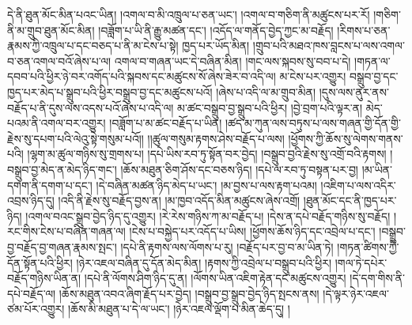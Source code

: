 དེ་ནི་ཐུན་མོང་མིན་པའང་ཡིན། །འགལ་བ་མི་འཁྲུལ་པ་ཅན་ཡང་། །འགལ་བ་གཅིག་ནི་མཚུངས་པར་རོ། །གཅིག་ནི་མ་གྲུབ་ཐུན་མོང་མིན། །བཟློག་པ་ཡི་ནི་རྒྱུ་མཚན་དང་། །འདོད་ལ་གནོད་བྱེད་ཀྱང་མ་བརྗོད། །རིགས་པ་ཅན་རྣམས་ཀྱི་འཁྲུལ་པ་དང་བཅད་པ་ནི་མ་ངེས་པ་སྟེ། ཁྱད་པར་ཡོད་མིན། །གྲུབ་པའི་མཐའ་ཁས་བླངས་པ་ལས་འགལ་བ་ཅན་འགལ་བའོ་ཞེས་པ་ལ། འགལ་བ་གཞན་ཡང་དེ་བཞིན་མིན། །གང་ལས་སྐབས་སུ་བབ་པ་དེ། །གཏན་ལ་དབབ་པའི་ཕྱིར་ཉེ་བར་འགོད་པའི་སྐབས་དང་མཚུངས་སོ་ཞེས་ཟེར་བ་འདི་ལ། མ་ངེས་པར་འགྱུར། བསྒྲུབ་བྱ་དང་ཁྱད་པར་མེད་པ་སྒྲུབ་པའི་ཕྱིར་བསྒྲུབ་བྱ་དང་མཚུངས་པའོ། །ཞེས་པ་འདི་ལ་མ་གྲུབ་མིན། །དུས་ལས་ནུར་ནས་བརྗོད་པ་ནི་དུས་ལས་འདས་པའོ་ཞེས་པ་འདི་ལ། མ་ཚང་བསྒྲུབ་བྱ་སྒྲུབ་པའི་ཕྱིར། །བྱེ་བྲག་པའི་ལྟར་ན། མེད་པའམ་ནི་འགལ་བར་འགྱུར། །བཟློག་པ་མ་ཚང་བརྗོད་པ་ཡིན། །ཚད་མ་ཀུན་ལས་བཏུས་པ་ལས་གཞན་གྱི་དོན་གྱི་རྗེས་སུ་དཔག་པའི་ལེའུ་སྟེ་གསུམ་པའོ།། །།ཚུལ་གསུམ་རྟགས་ཤེས་བརྗོད་པ་ལས། །ཕྱོགས་ཀྱི་ཆོས་སུ་ལེགས་གནས་པའི། །ལྷག་མ་ཚུལ་གཉིས་སུ་གྲགས་པ། །དཔེ་ཡིས་རབ་ཏུ་སྟོན་བར་བྱེད། །བསྒྲུབ་བྱའི་རྗེས་སུ་འགྲོ་བའི་རྟགས། །བསྒྲུབ་བྱ་མེད་ན་མེད་ཉིད་གང་། །ཆོས་མཐུན་ཅིག་ཤོས་དང་བཅས་ཉིད། །དཔེ་ལ་རབ་ཏུ་བསྟན་པར་བྱ། །མ་ཡིན་དགག་ནི་དགག་པ་དང་། །དེ་བཞིན་མཚན་ཉིད་མེད་པ་ཡང་། །མ་བྱས་པ་ལས་རྟག་པའམ། །འཇིག་པ་ལས་འདིར་འབྲས་ཉིད་དུ། །འདི་ནི་རྗེས་སུ་བརྗོད་བྱས་ན། །མ་ཁྱབ་འདོད་མིན་མཚུངས་ཞེས་འགྲོ། །ཐུན་མོང་དང་ནི་ཁྱད་པར་ཉིད། །འགལ་བའང་སྒྲུབ་བྱེད་ཉིད་དུ་འགྱུར། །རེ་རེས་གཉིས་ཀ་མ་བརྗོད་པ། །དེས་ན་དཔེ་བརྗོད་གཉིས་སུ་བརྗོད། །རང་གིས་ངེས་པ་བཞིན་གཞན་ལ། །ངེས་པ་བསྐྱེད་པར་འདོད་པ་ཡིས། །ཕྱོགས་ཆོས་ཉིད་དང་འབྲེལ་པ་དང་། །བསྒྲུབ་བྱ་བརྗོད་བྱ་གཞན་རྣམས་སྤང་། །དཔེ་ནི་རྟགས་ལས་ལོགས་པ་རུ། །བརྗོད་པར་བྱ་བ་མ་ཡིན་ཏེ། །གཏན་ཚིགས་ཀྱི་དོན་སྟོན་པའི་ཕྱིར། །ཉེར་འཇལ་བཞིན་དུ་དོན་མེད་མིན། །རྟགས་ཀྱི་འབྲེལ་པ་བསྒྲུབ་པའི་ཕྱིར། །གལ་ཏེ་དཔེར་བརྗོད་གཉིས་ཡིན་ན། །དཔེ་ནི་ལོགས་ཤིག་ཉིད་དུ་ན། །ལོགས་ཡིན་འཇིག་རྟེན་དང་མཚུངས་འགྱུར། །དེ་དག་གིས་ནི་དཔེ་བརྗོད་ལ། །ཆོས་མཐུན་འབའ་ཞིག་རྗོད་པར་བྱེད། །བསྒྲུབ་བྱ་སྒྲུབ་བྱེད་ཉིད་སྤངས་ནས། །དེ་ལྟར་ཉེར་འཇལ་ཙམ་པོར་འགྱུར། །ཆོས་མི་མཐུན་པ་དེ་ལ་ཡང་། །ཉེར་འཇལ་ལྡོག་པ་མིན་ཆེད་དུ། །

